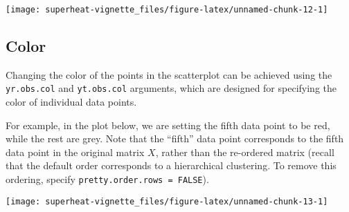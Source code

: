 \documentclass[]{book}
\newenvironment{Shaded}{\begin{snugshade}}{\end{snugshade}}
\newcommand{\KeywordTok}[1]{\textcolor[rgb]{0.13,0.29,0.53}{\textbf{{#1}}}}
\newcommand{\DataTypeTok}[1]{\textcolor[rgb]{0.13,0.29,0.53}{{#1}}}
\newcommand{\DecValTok}[1]{\textcolor[rgb]{0.00,0.00,0.81}{{#1}}}
\newcommand{\FloatTok}[1]{\textcolor[rgb]{0.00,0.00,0.81}{{#1}}}
\newcommand{\StringTok}[1]{\textcolor[rgb]{0.31,0.60,0.02}{{#1}}}
\newcommand{\CommentTok}[1]{\textcolor[rgb]{0.56,0.35,0.01}{\textit{{#1}}}}
\newcommand{\NormalTok}[1]{{#1}}
\theoremstyle{definition}
\theoremstyle{definition}
\theoremstyle{remark}
\begin{document}
\begin{center}\texttt{[image: superheat-vignette\_files/figure-latex/unnamed-chunk-12-1]} \end{center}

\subsection{Color}\label{color-1}

Changing the color of the points in the scatterplot can be achieved
using the \texttt{yr.obs.col} and \texttt{yt.obs.col} arguments, which
are designed for specifying the color of individual data points.

For example, in the plot below, we are setting the fifth data point to
be red, while the rest are grey. Note that the ``fifth'' data point
corresponds to the fifth data point in the original matrix \(X\), rather
than the re-ordered matrix (recall that the default order corresponds to
a hierarchical clustering. To remove this ordering, specify
\texttt{pretty.order.rows\ =\ FALSE}).

\begin{Shaded}
\end{Shaded}

\begin{center}\texttt{[image: superheat-vignette\_files/figure-latex/unnamed-chunk-13-1]} \end{center}
\end{document}
